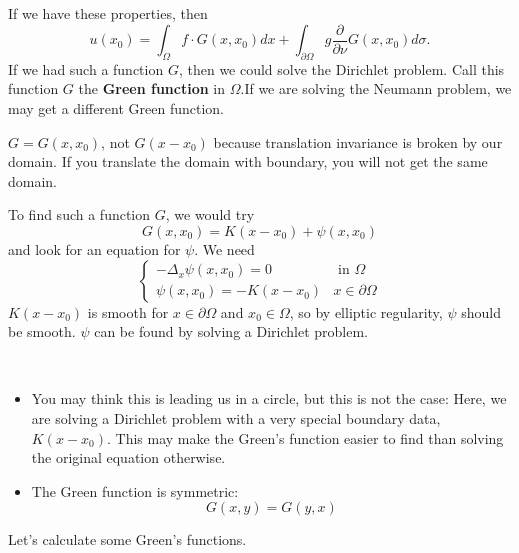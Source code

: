 If we have these properties, then
$$
u\left(x_{0}\right)=\int_{\Omega} f \cdot G\left(x, x_{0}\right) d x+\int_{\partial \Omega} g \frac{\partial}{\partial \nu} G\left(x, x_{0}\right) d \sigma .
$$
If we had such a function $G$, then we could solve the Dirichlet problem. Call this function $G$ the \textbf{Green function} in $\Omega$.If we are solving the Neumann problem, we may get a different Green function.

\begin{remark}
    $G=G\left(x, x_{0}\right)$, not $G\left(x-x_{0}\right)$ because translation invariance is broken by our domain. If you translate the domain with boundary, you will not get the same domain.
\end{remark}

To find such a function $G$, we would try
$$
G\left(x, x_{0}\right)=K\left(x-x_{0}\right)+\psi\left(x, x_{0}\right)
$$
and look for an equation for $\psi$. We need
$$
\begin{cases}-\Delta_{x} \psi\left(x, x_{0}\right)=0 & \text { in } \Omega \\ \psi\left(x, x_{0}\right)=-K\left(x-x_{0}\right) & x \in \partial \Omega\end{cases}
$$
$K\left(x-x_{0}\right)$ is smooth for $x \in \partial \Omega$ and $x_{0} \in \Omega$, so by elliptic regularity, $\psi$ should be smooth. $\psi$ can be found by solving a Dirichlet problem.

\begin{remark}
    ~\
    \begin{itemize}
        \item  You may think this is leading us in a circle, but this is not the case: Here, we are solving a Dirichlet problem with a very special boundary data, $K\left(x-x_{0}\right)$. This may make the Green's function easier to find than solving the original equation otherwise.
        \item The Green function is symmetric:
        $$
        G(x, y)=G(y, x)
        $$
    \end{itemize}
\end{remark}

Let's calculate some Green's functions.

